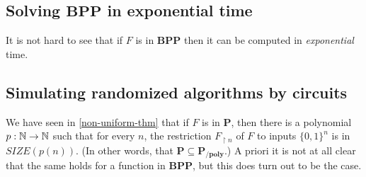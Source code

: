 \subsection{Solving \(\mathbf{BPP}\) in exponential
time}\label{Solving-mathbfBPP-in-expo}

It is not hard to see that if \(F\) is in \(\mathbf{BPP}\) then it can
be computed in \emph{exponential} time.

\hypertarget{BPPEXP}{}


\subsection{Simulating randomized algorithms by
circuits}\label{Simulating-randomized-alg}

We have seen in \cref{non-uniform-thm} that if \(F\) is in
\(\mathbf{P}\), then there is a polynomial \(p:{\mathbb{N}} \rightarrow {\mathbb{N}}\) such
that for every \(n\), the restriction \(F_{\upharpoonright n}\) of \(F\)
to inputs \(\{0,1\}^n\) is in \(\ensuremath{\mathit{SIZE}}(p(n))\). (In
other words, that \(\mathbf{P} \subseteq \mathbf{P_{/poly}}\).) A priori
it is not at all clear that the same holds for a function in
\(\mathbf{BPP}\), but this does turn out to be the case.


